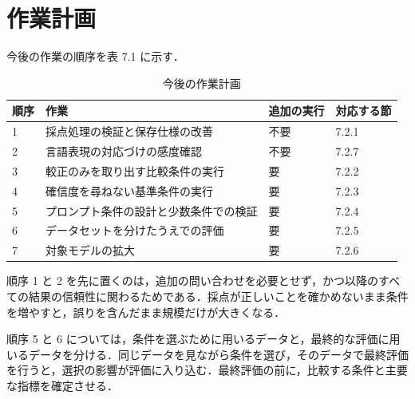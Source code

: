 \section{作業計画}

今後の作業の順序を表 7.1 に示す．

\begin{table}[htbp]
\centering
\small
\caption{今後の作業計画}
\label{tab:7.1}
\begin{tabularx}{\linewidth}{|l|X|l|l|}
\hline
順序 & 作業 & 追加の実行 & 対応する節 \\
\hline
1 & 採点処理の検証と保存仕様の改善 & 不要 & 7.2.1 \\
2 & 言語表現の対応づけの感度確認 & 不要 & 7.2.7 \\
3 & 較正のみを取り出す比較条件の実行 & 要 & 7.2.2 \\
4 & 確信度を尋ねない基準条件の実行 & 要 & 7.2.3 \\
5 & プロンプト条件の設計と少数条件での検証 & 要 & 7.2.4 \\
6 & データセットを分けたうえでの評価 & 要 & 7.2.5 \\
7 & 対象モデルの拡大 & 要 & 7.2.6 \\
\hline
\end{tabularx}
\end{table}

順序 1 と 2 を先に置くのは，追加の問い合わせを必要とせず，かつ以降のすべての結果の信頼性に関わるためである．採点が正しいことを確かめないまま条件を増やすと，誤りを含んだまま規模だけが大きくなる．

順序 5 と 6 については，条件を選ぶために用いるデータと，最終的な評価に用いるデータを分ける．同じデータを見ながら条件を選び，そのデータで最終評価を行うと，選択の影響が評価に入り込む．最終評価の前に，比較する条件と主要な指標を確定させる．
